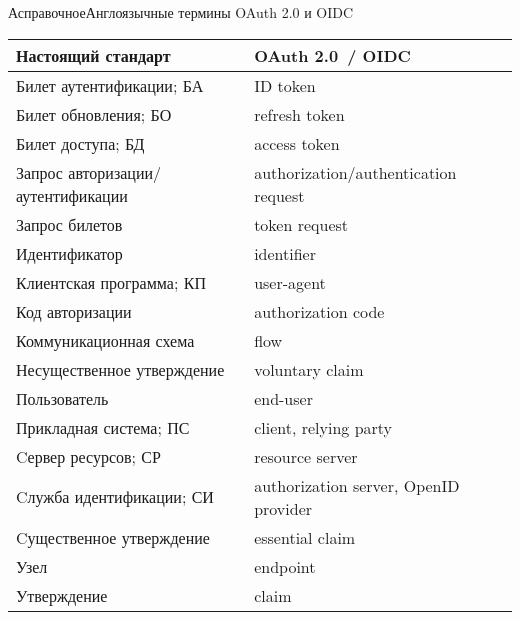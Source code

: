\begin{appendix}{А}{справочное}{Англоязычные термины OAuth 2.0 и OIDC}
\label{ENG} 

\mbox{}

\begin{center}
\begin{tabular}{|p{8cm}|p{8cm}|}
\hline
Настоящий стандарт & OAuth 2.0~/ OIDC\\
\hline
\hline
Билет аутентификации; БА & ID token\\
Билет обновления; БО & refresh token\\
Билет доступа; БД & access token\\
Запрос авторизации/аутентификации & authorization/authentication request\\ 
Запрос билетов & token request\\
Идентификатор & identifier\\
Клиентская программа; КП & user-agent\\
Код авторизации & authorization code\\
Коммуникационная схема & flow\\
Несущественное утверждение & voluntary claim\\
Пользователь & end-user\\
Прикладная система; ПС & client, relying party\\
Cервер ресурсов; СР & resource server\\
Cлужба идентификации; СИ & authorization server, OpenID provider\\
Cущественное утверждение & essential claim\\
Узел & endpoint\\
Утверждение & claim\\
\hline
\end{tabular}
\end{center}

\end{appendix}